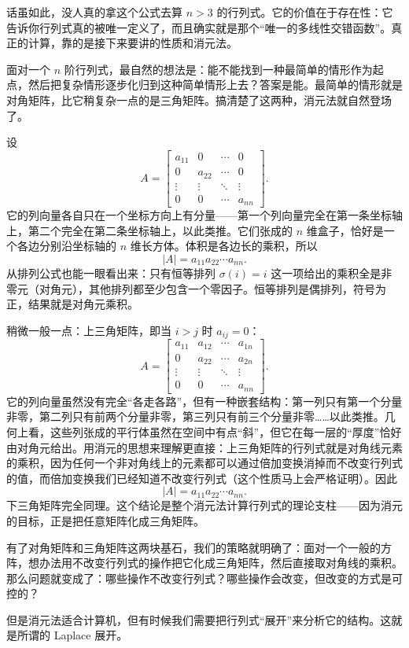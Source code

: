 \documentclass[UTF8]{ctexbook}
\begin{document}
话虽如此，没人真的拿这个公式去算 $n>3$ 的行列式。它的价值在于存在性：它告诉你行列式真的被唯一定义了，而且确实就是那个“唯一的多线性交错函数”。真正的计算，靠的是接下来要讲的性质和消元法。

面对一个 $n$ 阶行列式，最自然的想法是：能不能找到一种最简单的情形作为起点，然后把复杂情形逐步化归到这种简单情形上去？答案是能。最简单的情形就是对角矩阵，比它稍复杂一点的是三角矩阵。搞清楚了这两种，消元法就自然登场了。


设
\[
A=\begin{bmatrix}
a_{11} & 0 & \cdots & 0\\
0 & a_{22} & \cdots & 0\\
\vdots & \vdots & \ddots & \vdots\\
0 & 0 & \cdots & a_{nn}
\end{bmatrix}.
\]
它的列向量各自只在一个坐标方向上有分量——第一个列向量完全在第一条坐标轴上，第二个完全在第二条坐标轴上，以此类推。它们张成的 $n$ 维盒子，恰好是一个各边分别沿坐标轴的 $n$ 维长方体。体积是各边长的乘积，所以
\[
|A|=a_{11}a_{22}\cdots a_{nn}.
\]
从排列公式也能一眼看出来：只有恒等排列 $\sigma(i)=i$ 这一项给出的乘积全是非零元（对角元），其他排列都至少包含一个零因子。恒等排列是偶排列，符号为正，结果就是对角元乘积。

稍微一般一点：上三角矩阵，即当 $i>j$ 时 $a_{ij}=0$：
\[
A=\begin{bmatrix}
a_{11} & a_{12} & \cdots & a_{1n}\\
0 & a_{22} & \cdots & a_{2n}\\
\vdots & \vdots & \ddots & \vdots\\
0 & 0 & \cdots & a_{nn}
\end{bmatrix}.
\]
它的列向量虽然没有完全“各走各路”，但有一种嵌套结构：第一列只有第一个分量非零，第二列只有前两个分量非零，第三列只有前三个分量非零……以此类推。几何上看，这些列张成的平行体虽然在空间中有点“斜”，但它在每一层的“厚度”恰好由对角元给出。用消元的思想来理解更直接：上三角矩阵的行列式就是对角线元素的乘积，因为任何一个非对角线上的元素都可以通过倍加变换消掉而不改变行列式的值，而倍加变换我们已经知道不改变行列式（这个性质马上会严格证明）。因此
\[
|A|=a_{11}a_{22}\cdots a_{nn}.
\]
下三角矩阵完全同理。这个结论是整个消元法计算行列式的理论支柱——因为消元的目标，正是把任意矩阵化成三角矩阵。

有了对角矩阵和三角矩阵这两块基石，我们的策略就明确了：面对一个一般的方阵，想办法用不改变行列式的操作把它化成三角矩阵，然后直接取对角线的乘积。那么问题就变成了：哪些操作不改变行列式？哪些操作会改变，但改变的方式是可控的？

但是消元法适合计算机，但有时候我们需要把行列式“展开”来分析它的结构。这就是所谓的 Laplace 展开。
\end{document}
